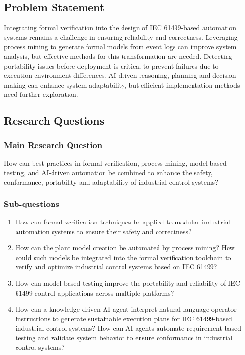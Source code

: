 \subsection{Problem Statement}
Integrating formal verification into the design of IEC 61499-based automation systems remains a challenge in ensuring reliability and correctness. Leveraging process mining to generate formal models from event logs can improve system analysis, but effective methods for this transformation are needed. Detecting portability issues before deployment is critical to prevent failures due to execution environment differences. AI-driven reasoning, planning and decision-making can enhance system adaptability, but efficient implementation methods need further exploration.

\subsection{Research Questions}
\subsubsection{Main Research Question}
How can best practices in formal verification, process mining, model-based testing, and AI-driven automation be combined to enhance the safety, conformance, portability and adaptability of industrial control systems?

\subsubsection{Sub-questions}
\begin{enumerate}
    \item How can formal verification techniques be applied to modular industrial automation systems to ensure their safety and correctness?
    
    \item How can the plant model creation be automated by process mining? How could such models be integrated into the formal verification toolchain to verify and optimize industrial control systems based on IEC 61499?
    
    \item How can model-based testing improve the portability and reliability of IEC 61499 control applications across multiple platforms?
    
    \item How can a knowledge-driven AI agent interpret natural-language operator instructions to generate sustainable execution plans for IEC 61499-based industrial control systems? How can AI agents automate requirement-based testing and validate system behavior to ensure conformance in industrial control systems?
\end{enumerate}

